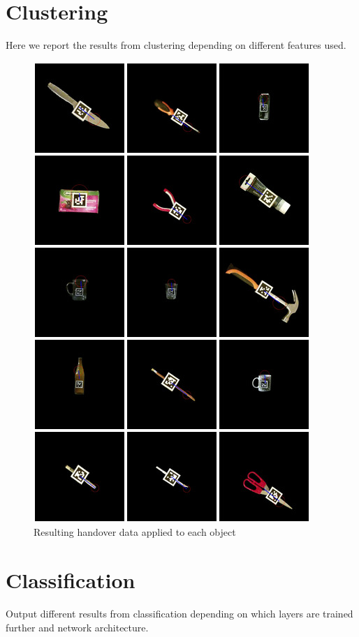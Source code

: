 \section{Clustering}
Here we report the results from clustering depending on different features used.

\begin{figure}
	\centering
	\includegraphics[width=\textwidth]{img/results/object_handovers.jpg}
	\caption{Resulting handover data applied to each object}
	\label{fig:object_handovers}
\end{figure}

\section{Classification}
Output different results from classification depending on which layers are trained further and network architecture.
